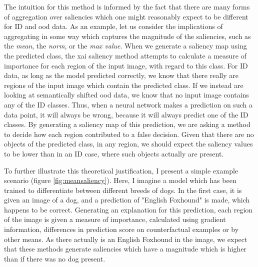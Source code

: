 \documentclass[UKenglish]{uiomasterthesis} %
\theoremstyle{definition}
\begin{document}
The intuition for this method is informed by the fact that there are many forms of aggregation over saliencies which one might reasonably expect to be different for ID and \ac{ood} data. As an example, let us consider the implications of aggregating in some way which captures the magnitude of the saliencies, such as the {\it mean}, the {\it norm}, or the {\it max value}. When we generate a saliency map using the predicted class, the \ac{xai} saliency method attempts to calculate a measure of importance for each region of the input image, with regard to this class. For ID data, as long as the model predicted correctly, we know that there really are regions of the input image which contain the predicted class. If we instead are looking at semantically shifted \ac{ood} data, we know that no input image contains any of the ID classes. Thus, when a neural network makes a prediction on such a data point, it will always be wrong, because it will always predict one of the ID classes. By generating a saliency map of this prediction, we are asking a method to decide how each region contributed to a false decision. Given that there are no objects of the predicted class, in any region, we should expect the saliency values to be lower than in an ID case, where such objects actually are present.

To further illustrate this theoretical justification, I present a simple example scenario (figure \ref{fig:meansaliency}). Here, I imagine a model which has been trained to differentiate between different breeds of dogs. In the first case, it is given an image of a dog, and a prediction of "English Foxhound" is made, which happens to be correct. Generating an explanation for this prediction, each region of the image is given a measure of importance, calculated using gradient information, differences in prediction score on counterfactual examples or by other means. As there actually is an English Foxhound in the image, we expect that these methods generate saliencies which have a magnitude which is higher than if there was no dog present.
\end{document}
